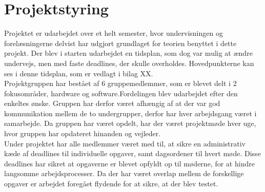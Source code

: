 \section{Projektstyring}
Projektet er udarbejdet over et helt semester, hvor undervisningen og forelæsningerne delvist har udgjort grundlaget for teorien benyttet i dette projekt. Der blev i starten udarbejdet en tidsplan, som dog var mulig at ændre undervejs, men med faste deadlines, der skulle overholdes. Hovedpunkterne kan ses i denne tidsplan, som er vedlagt i bilag XX. \\
Projektgruppen har bestået af 6 gruppemedlemmer, som er blevet delt i 2 fokusområder, hardware og software.Fordelingen blev udarbejdet efter den enkeltes ønske. Gruppen har derfor været afhængig af at der var god kommunikation mellem de to undergrupper, derfor har hver arbejdsgang været i samarbejde. Da gruppen har været opdelt, har der været projektmøde hver uge, hvor gruppen har opdateret hinanden og vejleder. \\
Under projektet har alle medlemmer været med til, at sikre en administrativ kæde af deadlines til individuelle opgaver, samt dagsordener til hvert møde. Disse deadlines har sikret at opgaverne er blevet opfyldt op til møderne, for at hindre langsomme arbejdsprocesser. Da der har været overlap mellem de forskellige opgaver er arbejdet foregået flydende for at sikre, at der blev testet. 

